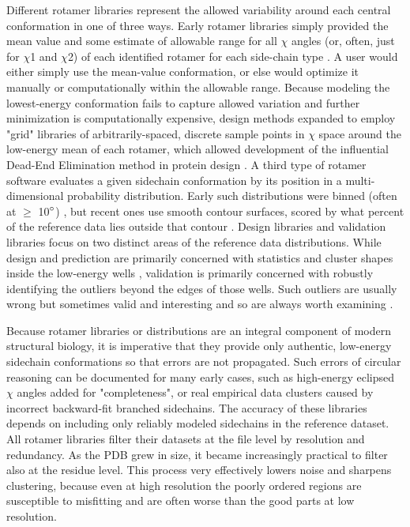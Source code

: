 Different rotamer libraries represent the allowed variability around each central conformation in one of three ways. Early rotamer libraries simply provided the mean value and some estimate of allowable range for all $\chi$ angles (or, often, just for $\chi$1 and $\chi$2) of each identified rotamer for each side-chain type \cite{Ponder1987, Tuffery1991,Schrauber1993}.  A user would either simply use the mean-value conformation, or else would optimize it manually or computationally within the allowable range. Because modeling the lowest-energy conformation fails to capture allowed variation and further minimization is computationally expensive, design methods expanded to employ "grid" libraries of arbitrarily-spaced, discrete sample points in $\chi$ space around the low-energy mean of each rotamer, which allowed development of the influential Dead-End Elimination method in protein design \cite{DeMaeyer1997,Gainza2013}.  A third type of rotamer software \cite{Dunbrack1997, Chen:2010kx} evaluates a given sidechain conformation by its position in a multi-dimensional probability distribution. Early such distributions were binned (often at $\ge$ 10$\degree$) \cite{Laskowski:gl0276}, but recent ones use smooth contour surfaces, scored by what percent of the reference data lies outside that contour \cite{lovell2000penultimate, Read2011}. \textcolor{changecolor}{Design libraries and validation libraries focus on two distinct areas of the reference data distributions. While design and prediction are primarily concerned with statistics and cluster shapes inside the low-energy wells \cite{Dunbrack1997}, validation is primarily concerned with robustly identifying the outliers beyond the edges of those wells. Such outliers are usually wrong but sometimes valid and interesting and so are always worth examining \cite{Richardson2013}.}

Because rotamer libraries or distributions are an integral component of modern structural biology, it is imperative that they provide only authentic, low-energy sidechain conformations so that errors are not propagated. Such errors of circular reasoning can be documented \cite{lovell2000penultimate} for many early cases, such as high-energy eclipsed $\chi$ angles added for "completeness", or real empirical data clusters caused by incorrect backward-fit branched sidechains. The accuracy of these libraries depends on including only reliably modeled sidechains in the reference dataset. All rotamer libraries filter their datasets at the file level by resolution and redundancy. As the PDB grew in size, it  became increasingly practical to filter also at the residue level. This process very effectively lowers noise and sharpens clustering, because even at high resolution the poorly ordered regions are susceptible to misfitting and are often worse than the good parts at low resolution.

